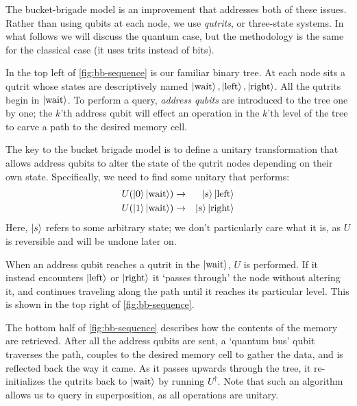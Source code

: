 \documentclass[a4paper,12pt]{article}
\begin{document}
The bucket-brigade model is an improvement that addresses both of these issues.
Rather than using qubits at each node, we use \emph{qutrits}, or three-state systems. 
In what follows we will discuss the quantum case, but the methodology is the same for the classical case (it uses trits instead of bits).

In the top left of \autoref{fig:bb-sequence} is our familiar binary tree. 
At each node sits a qutrit whose states are descriptively named $\ket{\hbox{wait}}, \ket{\hbox{left}}, \ket{\hbox{right}}$. 
All the qutrits begin in $\ket{\hbox{wait}}$. 
To perform a query, \emph{address qubits} are introduced to the tree one by one; the $k$'th address qubit will effect an operation in the $k$'th level of the tree to carve a path to the desired memory cell.

The key to the bucket brigade model is to define a unitary transformation that allows address qubits to alter the state of the qutrit nodes depending on their own state. 
Specifically, we need to find some unitary that performs:
\begin{eqnarray}
 U(\ket{0}\ket{\hbox{wait}}) &\rightarrow& \ket{s}\ket{\hbox{left}} \\
 U(\ket{1}\ket{\hbox{wait}}) &\rightarrow& \ket{s}\ket{\hbox{right}}
\end{eqnarray}
Here, $\ket{s}$ refers to some arbitrary state; we don't particularly care what it is, as $U$ is reversible and will be undone later on.

When an address qubit reaches a qutrit in the $\ket{\hbox{wait}}$, $U$ is performed. 
If it instead encounters $\ket{\hbox{left}}$ or $\ket{\hbox{right}}$ it `passes through' the node without altering it, and continues traveling along the path until it reaches its particular level. 
This is shown in the top right of \autoref{fig:bb-sequence}.

The bottom half of \autoref{fig:bb-sequence} describes how the contents of the memory are retrieved. 
After all the address qubits are sent, a `quantum bus' qubit traverses the path, couples to the desired memory cell to gather the data, and is reflected back the way it came. 
As it passes upwards through the tree, it re-initializes the qutrits back to $\ket{\hbox{wait}}$ by running $U^\dag$. 
Note that such an algorithm allows us to query in superposition, as all operations are unitary.
\end{document}
